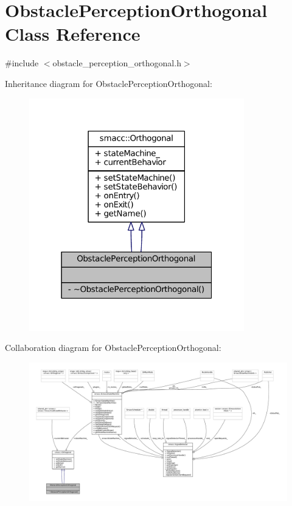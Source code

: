 \hypertarget{classObstaclePerceptionOrthogonal}{}\section{Obstacle\+Perception\+Orthogonal Class Reference}
\label{classObstaclePerceptionOrthogonal}


{\ttfamily \#include $<$obstacle\+\_\+perception\+\_\+orthogonal.\+h$>$}



Inheritance diagram for Obstacle\+Perception\+Orthogonal\+:
\nopagebreak
\begin{figure}[H]
\begin{center}
\leavevmode
\includegraphics[width=265pt]{classObstaclePerceptionOrthogonal__inherit__graph}
\end{center}
\end{figure}


Collaboration diagram for Obstacle\+Perception\+Orthogonal\+:
\nopagebreak
\begin{figure}[H]
\begin{center}
\leavevmode
\includegraphics[width=350pt]{classObstaclePerceptionOrthogonal__coll__graph}
\end{center}
\end{figure}
